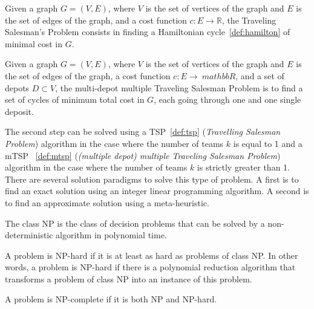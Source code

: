 \begin{definition}
	\label{def:tsp}
	Given a graph $G = (V, E)$, where $V$ is the set of vertices of the graph and $E$ is the set of edges of the graph, and a cost function $c : E \rightarrow \mathbb{R}$, the Traveling Salesman's Problem consists in finding a Hamiltonian cycle~\ref{def:hamilton} of minimal cost in $G$.
\end{definition}

\begin{definition}
	\label{def:mtsp}
	Given a graph $G = (V, E)$, where $V$ is the set of vertices of the graph and $E$ is the set of edges of the graph, a cost function $c : E \rightarrow \ mathbb{R}$, and a set of depots $D \subset V$, the multi-depot multiple Traveling Salesman Problem is to find a set of cycles of minimum total cost in $G$, each going through one and one single deposit.
\end{definition}

The second step can be solved using a TSP~\ref{def:tsp} (\textit{Travelling Salesman Problem}) algorithm in the case where the number of teams $k$ is equal to 1 and a mTSP ~\ref{def:mtsp} (\textit{(multiple depot) multiple Traveling Salesman Problem}) algorithm in the case where the number of teams $k$ is strictly greater than 1.
There are several solution paradigms to solve this type of problem.
A first is to find an exact solution using an integer linear programming algorithm.
A second is to find an approximate solution using a meta-heuristic.

\begin{definition}[NP Class]
	\label{def:np}
	The class NP is the class of decision problems that can be solved by a non-deterministic algorithm in polynomial time.
\end{definition}

\begin{definition}
	\label{def:nph}
	A problem is NP-hard if it is at least as hard as problems of class NP.
	In other words, a problem is NP-hard if there is a polynomial reduction algorithm that transforms a problem of class NP into an instance of this problem.
\end{definition}

\begin{definition}
	\label{def:npc}
	A problem is NP-complete if it is both NP and NP-hard.
\end{definition}

